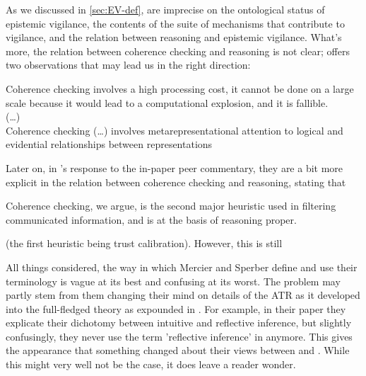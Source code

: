 As we discussed in \cref{sec:EV-def}, \citet{Sperber10} are imprecise on the ontological status of epistemic vigilance, the contents of the suite of mechanisms that contribute to vigilance, and the relation between reasoning and epistemic vigilance.
What's more, the relation between coherence checking and reasoning is not clear; \citet{Sperber01} offers two observations that may lead us in the right direction:
\begin{quoting}
    Coherence checking involves a high processing cost, it cannot be done on a large scale because it would lead to a computational explosion, and it is fallible.
    \\ (\ldots) \\
    Coherence checking (\ldots) involves metarepresentational attention to logical and evidential relationships between representations
    \hfill \citep[p.~410]{Sperber01}
\end{quoting}
Later on, in 's response to the in-paper peer commentary, they are a bit more explicit in the relation between coherence checking and reasoning, stating that
\begin{quoting}
    Coherence checking, we argue, is the second major heuristic used in filtering communicated information, and is at the basis of reasoning proper.
    \hfill \citep[p.~96]{MS11}
\end{quoting}
(the first heuristic being trust calibration). However, this is still 


All things considered, the way in which Mercier and Sperber define and use their terminology is vague at its best and confusing at its worst. The problem may partly stem from them changing their mind on details of the ATR as it developed into the full-fledged theory as expounded in \citet{MS17}.
For example, in their \citeyear{MS09} paper they explicate their dichotomy between intuitive and reflective inference, but slightly confusingly, they never use the term 'reflective inference' in \citet{MS11} anymore. This gives the appearance that something changed about their views between \citeyear{MS09} and \citeyear{MS11}. While this might very well not be the case, it does leave a reader wonder.

